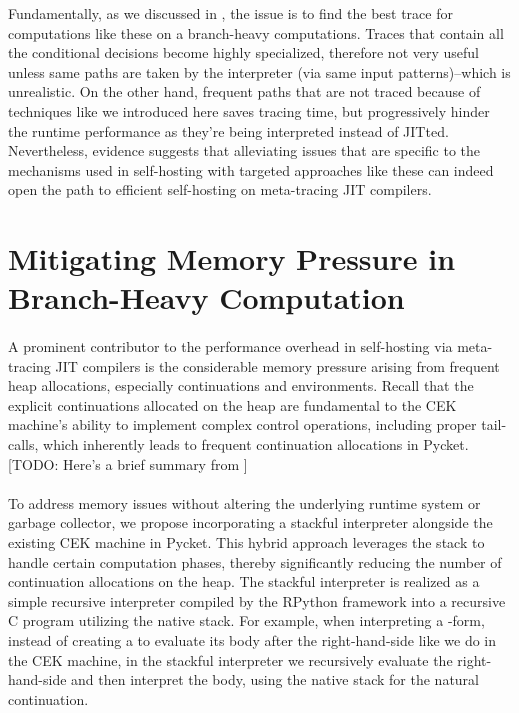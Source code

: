     \begin{paragraph-here}%
      Fundamentally, as we discussed in , the issue is to find the best trace for computations like these on a branch-heavy computations. Traces that contain all the conditional decisions become highly specialized, therefore not very useful unless same paths are taken by the interpreter (via same input patterns)--which is unrealistic. On the other hand, frequent paths that are not traced because of techniques like we introduced here saves tracing time, but progressively hinder the runtime performance as they're being interpreted instead of JITted. Nevertheless, evidence suggests that alleviating issues that are specific to the mechanisms used in self-hosting with targeted approaches like these can indeed open the path to efficient self-hosting on meta-tracing JIT compilers.
    \end{paragraph-here}


	\section[\texorpdfstring{Mitigating Memory Pressure in Branch-Heavy Computation}{CEK + Stackful Model}]{Mitigating Memory Pressure in Branch-Heavy Computation}
    \label{section:stackful}

    \paragraph{}%
      A prominent contributor to the performance overhead in self-hosting via meta-tracing JIT compilers is the considerable memory pressure arising from frequent heap allocations, especially continuations and environments. Recall that the explicit continuations allocated on the heap are fundamental to the CEK machine's ability to implement complex control operations, including proper tail-calls, which inherently leads to frequent continuation allocations in Pycket. [TODO: Here's a brief summary from ]

    \paragraph{}%
      To address memory issues without altering the underlying runtime system or garbage collector, we propose incorporating a stackful interpreter alongside the existing CEK machine in Pycket. This hybrid approach leverages the stack to handle certain computation phases, thereby significantly reducing the number of continuation allocations on the heap. The stackful interpreter is realized as a simple recursive interpreter compiled by the RPython framework into a recursive C program utilizing the native stack. For example, when interpreting a -form, instead of creating a  to evaluate its body after the right-hand-side like we do in the CEK machine, in the stackful interpreter we recursively evaluate the right-hand-side and then interpret the body, using the native stack for the natural continuation.

